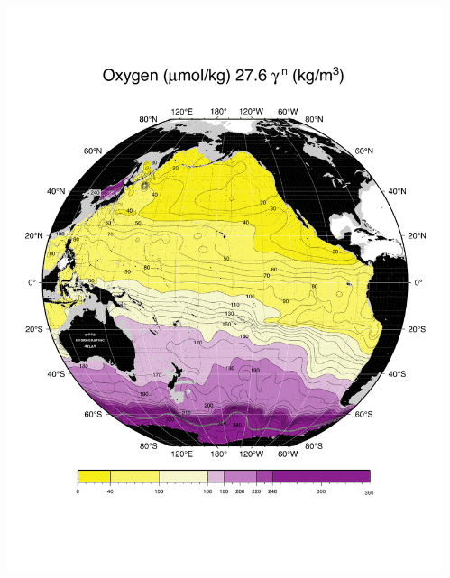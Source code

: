 \documentclass{beamer}
\begin{document}
\begin{frame}[plain,t]
\begin{columns}
\begin{column}{0.33\textwidth}
          \includegraphics[width=\textwidth]{oxygen_isopyc_final_pdf/pac2760_oxygen_final.pdf}  
      \end{column}
      \begin{column}{0.33\textwidth}

\end{column}
\end{columns}
\end{frame}
\end{document}
